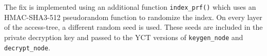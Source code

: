 The fix is implemented using an additional function \verb+index_prf()+ which uses an HMAC-SHA3-512 pseudorandom function to randomize the index.
On every layer of the \gls{access-tree}, a different random seed is used. 
These seeds are included in the private decryption key and passed to the YCT versions of \verb+keygen_node+ and \verb+decrypt_node+.

